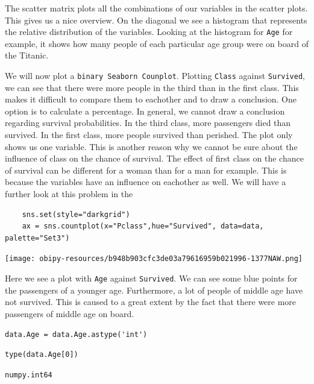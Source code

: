 \documentclass[11pt]{article}
\begin{document}
The scatter matrix plots all the combinations of our variables in the scatter plots. This gives us a nice overview. On the diagonal we see a histogram that represents the relative distribution of the variables. Looking at the histogram for \texttt{Age} for example, it shows how many people of each particular age group were on board of the Titanic. 


We will now plot a \texttt{binary Seaborn Counplot}. Plotting \texttt{Class} against \texttt{Survived}, we can see that there were more people in the third than in the first class. This makes it difficult to compare them to eachother and to draw a conclusion. One option is to calculate a percentage. In general, we cannot draw a conclusion regarding survival probabilities. In the third class, more passengers died than survived. In the first class, more people survived than perished. The plot only shows us one variable. This is another reason why we cannot be sure about the influence of class on the chance of survival. The effect of first class on the chance of survival can be different for a woman than for a man for example. This is because the variables have an influence on eachother as well. We will have a further look at this problem in the 
\begin{verbatim}
    sns.set(style="darkgrid")
    ax = sns.countplot(x="Pclass",hue="Survived", data=data, palette="Set3")
\end{verbatim}

\begin{center}
\texttt{[image: obipy-resources/b948b903cfc3de03a79616959b021996-1377NAW.png]}
\end{center}

Here we see a plot with \texttt{Age} against \texttt{Survived}. We can see some blue points for the passengers of a younger age. Furthermore, a lot of people of middle age have not survived. This is caused to a great extent by the fact that there were more passengers of middle age on board.

\begin{verbatim}
data.Age = data.Age.astype('int')
\end{verbatim}

\begin{verbatim}
type(data.Age[0])
\end{verbatim}

\begin{verbatim}
numpy.int64
\end{verbatim}
\end{document}
